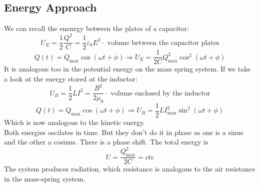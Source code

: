 \documentclass{report}
\begin{document}
          \subsection{Energy Approach}
            \noindent We can recall the enenrgy between the plates of a capacitor:
            \[U_E=\dfrac{1}{2}\dfrac{Q^2}{C}=\dfrac12\varepsilon_0 E^2\cdot \text{ volume between the capacitor plates}\]
            \[Q(t)=Q_\text{max}\cos(\omega t+\phi)\Longrightarrow U_E=\dfrac{1}{2C}Q^2_\text{max}\cos^2(\omega t+\phi)\]
            \noindent It is analogous too in the potential energy on the mass spring system. If we take a look at the energy stored at the inductor:
            \[U_B=\dfrac{1}{2}LI^2=\dfrac{B^2}{2\mu_0}\cdot \text{ volume enclosed by the inductor}\]
            \[Q(t)=Q_\text{max}\cos(\omega t+\phi)\Longrightarrow U_B=\dfrac{1}{2}LI^2_\text{max}\sin^2(\omega t+\phi)\]
            \noindent Which is now analogous to the kinetic energy.\\

            \noindent Both energies oscilates in time. But they don't do it in phase as one is a sinus and the other a cosinus. There is a phase shift. The total energy is
            \begin{equation}
             \boxed{ U=\dfrac{Q_\text{max}^2}{2C}=cte}
            \end{equation}
            \noindent The system produces radiation, which resistance is analogous to the air resistance in the mass-spring system.
\end{document}
